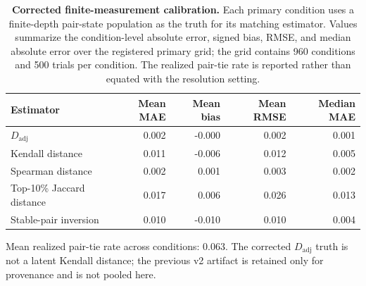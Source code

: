 \begin{table}[t]
\centering
\caption{\textbf{Corrected finite-measurement calibration.} Each primary
condition uses a finite-depth pair-state population as the truth for its
matching estimator. Values summarize the condition-level absolute error,
signed bias, RMSE, and median absolute error over the registered primary grid;
the grid contains 960 conditions and 500 trials per condition. The realized
pair-tie rate is reported rather than equated with the resolution setting.}
\label{tab:finite-measurement-v21}
\small
\begin{tabular}{lrrrr}
\toprule
Estimator & Mean MAE & Mean bias & Mean RMSE & Median MAE \\
\midrule
$D_{\mathrm{adj}}$ & 0.002 & -0.000 & 0.002 & 0.001 \\
Kendall distance & 0.011 & -0.006 & 0.012 & 0.005 \\
Spearman distance & 0.002 & 0.001 & 0.003 & 0.002 \\
Top-10\% Jaccard distance & 0.017 & 0.006 & 0.026 & 0.013 \\
Stable-pair inversion & 0.010 & -0.010 & 0.010 & 0.004 \\
\bottomrule
\end{tabular}
\par\smallskip
\raggedright\footnotesize Mean realized pair-tie rate across conditions:
0.063. The corrected $D_{\mathrm{adj}}$ truth is
not a latent Kendall distance; the previous v2 artifact is retained only for
provenance and is not pooled here.
\end{table}
